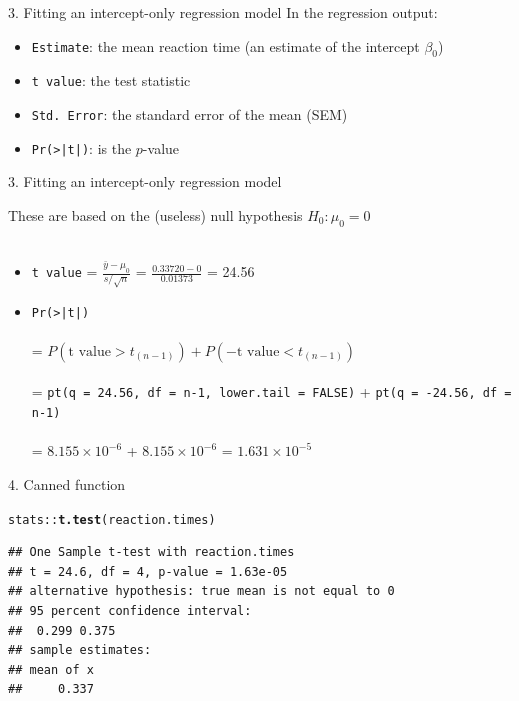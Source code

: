 \documentclass[10pt,handout]{beamer}\usepackage[]{graphicx}\usepackage[]{color}
\makeatletter
\newcommand{\hlopt}[1]{\textcolor[rgb]{0,0,0}{#1}}%
\newcommand{\hlstd}[1]{\textcolor[rgb]{0.345,0.345,0.345}{#1}}%
\newcommand{\hlkwd}[1]{\textcolor[rgb]{0.737,0.353,0.396}{\textbf{#1}}}%
\newenvironment{kframe}{%
 \def\at@end@of@kframe{}%
 \ifinner\ifhmode%
  \def\at@end@of@kframe{\end{minipage}}%
  \begin{minipage}{\columnwidth}%
 \fi\fi%
 \def\FrameCommand##1{\hskip\@totalleftmargin \hskip-\fboxsep
 \colorbox{shadecolor}{##1}\hskip-\fboxsep
     \hskip-\linewidth \hskip-\@totalleftmargin \hskip\columnwidth}%
 \MakeFramed {\advance\hsize-\width
   \@totalleftmargin\z@ \linewidth\hsize
   \@setminipage}}%
 {\par\unskip\endMakeFramed%
 \at@end@of@kframe}
\newenvironment{knitrout}{}{} %
\makeatother
\begin{document}
\begin{frame}[fragile]{3. Fitting an intercept-only regression model}
	In the regression output:
	\begin{itemize}
		\setlength\itemsep{1em}
		\item \texttt{Estimate}: the mean reaction time (an estimate of the intercept $\beta_0$)
		\item \texttt{t value}: the test statistic 
		\item \texttt{Std. Error}: the standard error of the mean (SEM)
		\item \texttt{Pr(>|t|)}: is the $p$-value
	\end{itemize} 
	
	
\end{frame}


\begin{frame}[fragile]{3. Fitting an intercept-only regression model}
	

	
	\small
	These are based on the (useless) null hypothesis $H_0: \mu_0 = 0$ \\ \ \\
	
	\begin{itemize}
		\item \texttt{t value} = $\frac{\bar{y} - \mu_0}{s / \sqrt{n}}$ = $\frac{0.33720 - 0}{0.01373}$ = 24.56
		\item \texttt{Pr(>|t|)} \\ \ \\
		= $P(\textrm{t value} > t_{(n-1)}) + P(-\textrm{t value} < t_{(n-1)})$ \\ \ \\
		= \small{\texttt{pt(q = 24.56, df = n-1, lower.tail = FALSE)} +  \texttt{pt(q = -24.56, df = n-1)}} \\ \ \\
		= \ensuremath{8.155\times 10^{-6}} + \ensuremath{8.155\times 10^{-6}} = \ensuremath{1.631\times 10^{-5}}
	\end{itemize}
	
	
\end{frame}



\begin{frame}[fragile]{4. Canned function}
	
\begin{knitrout}\tiny
{}\color{fgcolor}\begin{kframe}
\begin{alltt}
\hlstd{stats}\hlopt{::}\hlkwd{t.test}\hlstd{(reaction.times)}
\end{alltt}
\begin{verbatim}
## One Sample t-test with reaction.times 
## t = 24.6, df = 4, p-value = 1.63e-05
## alternative hypothesis: true mean is not equal to 0 
## 95 percent confidence interval:
##  0.299 0.375 
## sample estimates:
## mean of x 
##     0.337
\end{verbatim}
\end{kframe}
\end{knitrout}
	
\end{frame}
\end{document}
